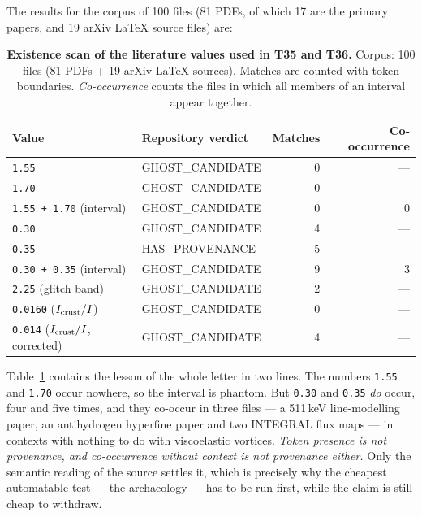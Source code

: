 \documentclass[11pt,a4paper]{article}
\begin{document}
The results for the corpus of 100 files (81 PDFs, of which 17 are the
primary papers, and 19 arXiv LaTeX source files) are:
\begin{table}[!htbp]
\centering\footnotesize
\setlength{\tabcolsep}{5pt}
\caption{\textbf{Existence scan of the literature values used in T35 and T36.}
Corpus: 100 files (81 PDFs + 19 arXiv LaTeX sources). Matches are counted with
token boundaries. \emph{Co-occurrence} counts the files in which all members
of an interval appear together.}
\label{tab:scan}
\vspace{0.1cm}
\begin{tabular}{@{}llrr@{}}
\toprule
Value & Repository verdict & Matches & Co-occurrence \\
\midrule
\texttt{1.55} & GHOST\_CANDIDATE & 0 & --- \\
\texttt{1.70} & GHOST\_CANDIDATE & 0 & --- \\
\texttt{1.55\,+\,1.70} (interval) & GHOST\_CANDIDATE & 0 & 0 \\
\texttt{0.30} & GHOST\_CANDIDATE & 4 & --- \\
\texttt{0.35} & HAS\_PROVENANCE & 5 & --- \\
\texttt{0.30\,+\,0.35} (interval) & GHOST\_CANDIDATE & 9 & 3 \\
\texttt{2.25} (glitch band) & GHOST\_CANDIDATE & 2 & --- \\
\texttt{0.0160} ($I_{\rm crust}/I$) & GHOST\_CANDIDATE & 0 & --- \\
\texttt{0.014} ($I_{\rm crust}/I$, corrected) & GHOST\_CANDIDATE & 4 & --- \\
\bottomrule
\end{tabular}
\end{table}

Table~\ref{tab:scan} contains the lesson of the whole letter in two lines.
The numbers \texttt{1.55} and \texttt{1.70} occur nowhere, so the interval
is phantom. But \texttt{0.30} and \texttt{0.35} \emph{do} occur, four and
five times, and they co-occur in three files --- a 511\,keV line-modelling
paper, an antihydrogen hyperfine paper and two INTEGRAL flux maps --- in
contexts with nothing to do with viscoelastic vortices. \emph{Token presence
is not provenance, and co-occurrence without context is not provenance
either.} Only the semantic reading of the source settles it, which is
precisely why the cheapest automatable test --- the archaeology --- has to be
run first, while the claim is still cheap to withdraw.
\end{document}
